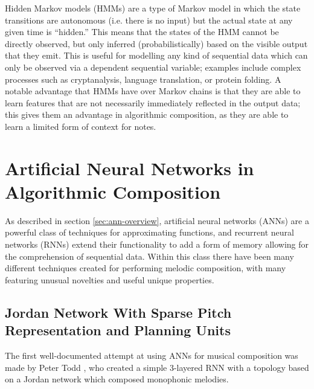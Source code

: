 \documentclass[ author={Stephen Livermore-Tozer},
				supervisor={Dr. Peter Flach},
				degree={MEng},
				title={Algorithmic Co-composition Using Machine Learning},
				subtitle={},
				type={research},
				year={2016} ]{dissertation}
\begin{document}
	Hidden Markov models (HMMs) are a type of Markov model in which the state transitions are autonomous (i.e. there is no input) but the actual state at any given time is ``hidden.'' This means that the states of the HMM cannot be directly observed, but only inferred (probabilistically) based on the visible output that they emit. This is useful for modelling any kind of sequential data which can only be observed via a dependent sequential variable; examples include complex processes such as cryptanalysis, language translation, or protein folding. A notable advantage that HMMs have over Markov chains is that they are able to learn features that are not necessarily immediately reflected in the output data; this gives them an advantage in algorithmic composition, as they are able to learn a limited form of context for notes.
	
	\section{Artificial Neural Networks in Algorithmic Composition}
	\label{sec:anns}
	
	As described in section \ref{sec:ann-overview}, artificial neural networks (ANNs) are a powerful class of techniques for approximating functions, and recurrent neural networks (RNNs) extend their functionality to add a form of memory allowing for the comprehension of sequential data. Within this class there have been many different techniques created for performing melodic composition, with many featuring unusual novelties and useful unique properties.
	
	\subsection{Jordan Network With Sparse Pitch Representation and Planning Units}
	\label{sec:todd-net}
	
	The first well-documented attempt at using ANNs for musical composition was made by Peter Todd \cite{todd1989connectionist}, who created a simple 3-layered RNN with a topology based on a Jordan network \cite{jordan1997serial} which composed monophonic melodies.
	
\end{document}
